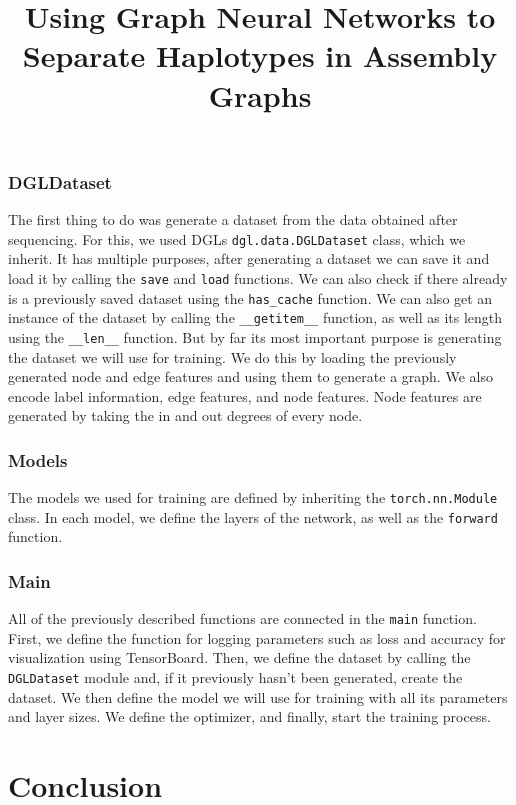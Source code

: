 \documentclass[times, utf8, diplomski, english]{fer_eng}
\begin{document}
\subsection{DGLDataset}

The first thing to do was generate a dataset from the data obtained after sequencing. For this, we used DGLs \texttt{dgl.data.DGLDataset} class, which we inherit. It has multiple purposes, after generating a dataset we can save it and load it by calling the \texttt{save} and \texttt{load} functions. We can also check if there already is a previously saved dataset using the \texttt{has\_cache} function. We can also get an instance of the dataset by calling the \texttt{\_\_getitem\_\_} function, as well as its length using the \texttt{\_\_len\_\_} function. But by far its most important purpose is generating the dataset we will use for training. We do this by loading the previously generated node and edge features and using them to generate a graph. We also encode label information, edge features, and node features. Node features are generated by taking the in and out degrees of every node.

\subsection{Models}

The models we used for training are defined by inheriting the \texttt{torch.nn.Module} class. In each model, we define the layers of the network, as well as the \texttt{forward} function.

\subsection{Main}

All of the previously described functions are connected in the \texttt{main} function. First, we define the function for logging parameters such as loss and accuracy for visualization using TensorBoard. Then, we define the dataset by calling the \texttt{DGLDataset} module and, if it previously hasn't been generated, create the dataset. We then define the model we will use for training with all its parameters and layer sizes. We define the optimizer, and finally, start the training process.

\chapter{Conclusion}




\clearpage

\title{Using Graph Neural Networks to Separate Haplotypes in Assembly Graphs}
\begin{abstract}

\keywords{}
\end{abstract}

\hrtitle{}
\begin{sazetak}

\kljucnerijeci{}
\end{sazetak}
\end{document}
